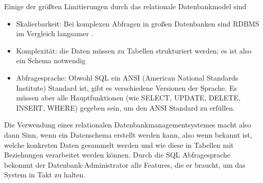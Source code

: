 Einige der größten Limitierungen \cite{MELD.CH2-relationaleDB.rdbmsBuch} durch das relationale Datenbankmodel sind
\begin{itemize}
\item Skalierbarkeit: Bei komplexen Abfragen in großen Datenbanken sind RDBMS im Vergleich langsamer \cite{MELD.CH2-relationaleDB.performacne}.
\item Komplexität: die Daten müssen zu Tabellen strukturiert werden; es ist also ein Schema notwendig
\item Abfragesprache: Obwohl SQL ein ANSI (American National Standards Institute) Standard ist, gibt es verschiedene Versionen der Sprache. Es müssen aber alle Hauptfunktionen (wie SELECT, UPDATE, DELETE, INSERT, WHERE) gegeben sein, um den ANSI Standard zu erfüllen.
\end{itemize}

Die Verwendung eines relationalen Datenbankmanagementsystemes macht also dann Sinn, wenn ein Datenschema erstellt werden kann, also wenn bekannt ist, welche konkreten Daten gesammelt werden und wie diese in Tabellen mit Beziehungen verarbeitet werden können. Durch die SQL Abfragesprache bekommt der Datenbank-Administrator alle Features, die er braucht, um das System in Takt zu halten.